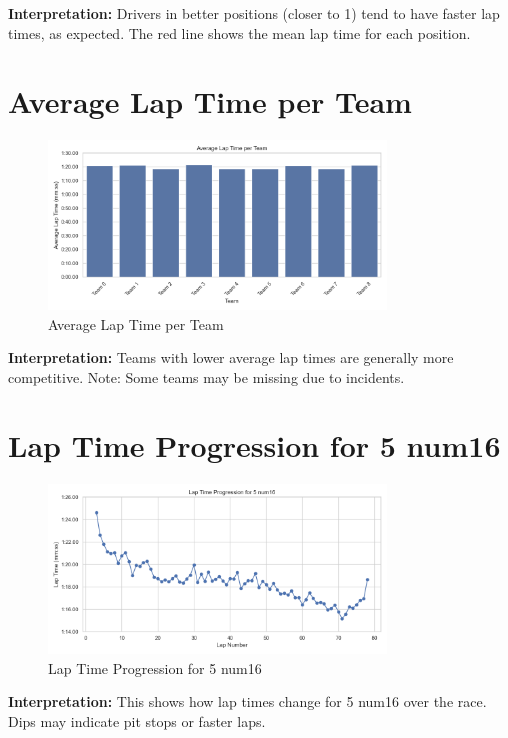 \documentclass{article}
\begin{document}
\textbf{Interpretation:} Drivers in better positions (closer to 1) tend to have faster lap times, as expected. The red line shows the mean lap time for each position.


\section*{ Average Lap Time per Team }
\begin{figure}[h!]
    \centering
    \includegraphics[width=0.8\textwidth]{ data/processed/2024/Monaco Grand Prix/avg_lap_time_per_team.png }
    \caption{ Average Lap Time per Team }
\end{figure}

\textbf{Interpretation:} Teams with lower average lap times are generally more competitive. Note: Some teams may be missing due to incidents.


\section*{ Lap Time Progression for 5 num16 }
\begin{figure}[h!]
    \centering
    \includegraphics[width=0.8\textwidth]{ data/processed/2024/Monaco Grand Prix/lap_time_progression_driver_5_num16.png }
    \caption{ Lap Time Progression for 5 num16 }
\end{figure}

\textbf{Interpretation:} This shows how lap times change for 5 num16 over the race. Dips may indicate pit stops or faster laps.
\end{document}
